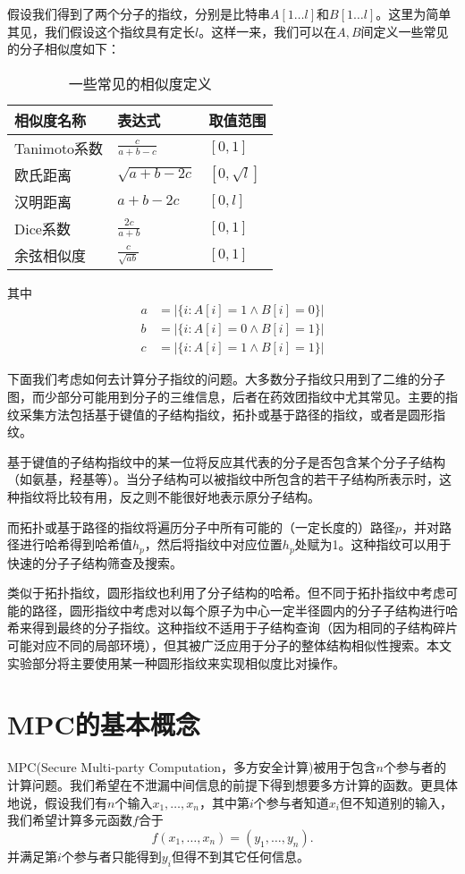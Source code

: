 假设我们得到了两个分子的指纹，分别是比特串$A[1\dots l]$和$B[1\dots l]$。这里为简单其见，我们假设这个指纹具有定长$l$。这样一来，我们可以在$A,B$间定义一些常见的分子相似度如下：
\begin{table}[H]
	\centering
	\caption{一些常见的相似度定义}
	\begin{tabular}{l l l}
		\hline
		相似度名称 & 表达式 & 取值范围\\
		\hline
		Tanimoto系数 & $\frac{c}{a+b-c}$ & $[0,1]$\\
		欧氏距离 & $\sqrt{a+b-2c}$ & $[0,\sqrt{l}]$\\
		汉明距离 & $a+b-2c$ & $[0,l]$\\
		Dice系数 & $\frac{2c}{a+b}$ & $[0,1]$\\
		余弦相似度 & $\frac{c}{\sqrt{ab}}$ & $[0,1]$\\
		\hline
	\end{tabular}
\end{table}
其中
\begin{align*}
a&=|\{i:A[i]=1\wedge B[i]=0\}|\\
b&=|\{i:A[i]=0\wedge B[i]=1\}|\\
c&=|\{i:A[i]=1\wedge B[i]=1\}|
\end{align*}

下面我们考虑如何去计算分子指纹的问题。大多数分子指纹只用到了二维的分子图，而少部分可能用到分子的三维信息，后者在药效团指纹中尤其常见。主要的指纹采集方法包括基于键值的子结构指纹，拓扑或基于路径的指纹，或者是圆形指纹。

基于键值的子结构指纹中的某一位将反应其代表的分子是否包含某个分子子结构（如氨基，羟基等）。当分子结构可以被指纹中所包含的若干子结构所表示时，这种指纹将比较有用，反之则不能很好地表示原分子结构。

而拓扑或基于路径的指纹将遍历分子中所有可能的（一定长度的）路径$p$，并对路径进行哈希得到哈希值$h_p$，然后将指纹中对应位置$h_p$处赋为1。这种指纹可以用于快速的分子子结构筛查及搜索。

类似于拓扑指纹，圆形指纹也利用了分子结构的哈希。但不同于拓扑指纹中考虑可能的路径，圆形指纹中考虑对以每个原子为中心一定半径圆内的分子子结构进行哈希来得到最终的分子指纹。这种指纹不适用于子结构查询（因为相同的子结构碎片可能对应不同的局部环境），但其被广泛应用于分子的整体结构相似性搜索。本文实验部分将主要使用某一种圆形指纹来实现相似度比对操作。

\section{MPC的基本概念}
\label{section: mpc}
MPC(Secure Multi-party Computation，多方安全计算)被用于包含$n$个参与者的计算问题。我们希望在不泄漏中间信息的前提下得到想要多方计算的函数。更具体地说，假设我们有$n$个输入$x_1,\dots,x_n$，其中第$i$个参与者知道$x_i$但不知道别的输入，我们希望计算多元函数$f$合于
\begin{equation}
f(x_1,\dots,x_n)=(y_1,\dots,y_n).
\end{equation}
并满足第$i$个参与者只能得到$y_i$但得不到其它任何信息。

